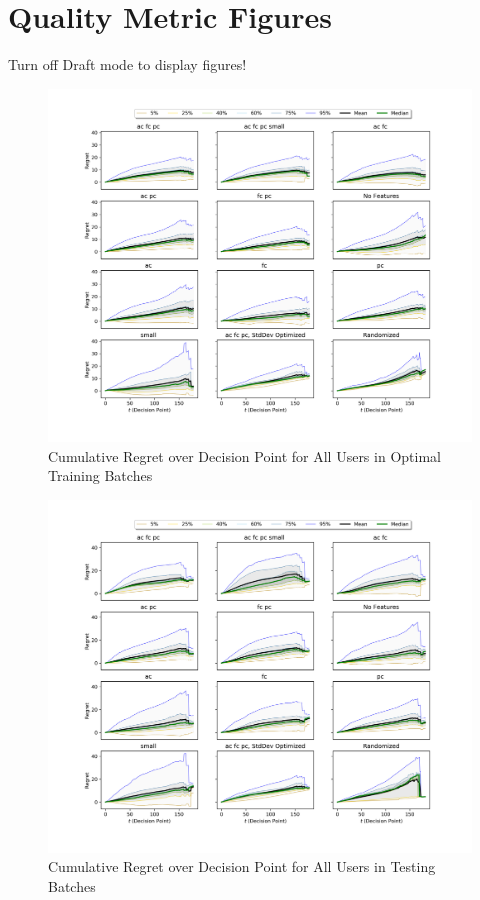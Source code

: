 \section{Quality Metric Figures}
\label{Quality Metric Figures}

	\ifdraft
	Turn off Draft mode to display figures!
	\else

	\begin{figure}[H]
	\includegraphics[width=1.5\textwidth,center]{figures/QM2train.png}%
	\caption{Cumulative Regret over Decision Point for All Users in Optimal Training Batches}
	\label{QM2train}
	\end{figure}

	\begin{figure}[H]
	\includegraphics[width=1.5\textwidth,center]{figures/QM2test.png}%
	\caption{Cumulative Regret over Decision Point for All Users in Testing Batches}
	\label{QM2test}
	\end{figure}

